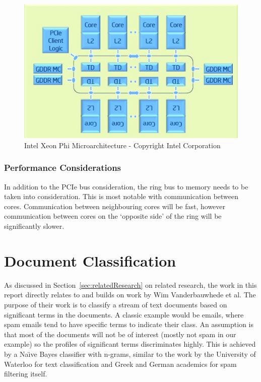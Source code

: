 \begin{figure}[H]
\centering
\includegraphics{images/intelXeonPhiMicroarchitecture.jpg}
\caption{Intel Xeon Phi Microarchitecture - Copyright Intel Corporation \textcopyright}
\label{fig:phiMicroarchitecture}
\end{figure}

\subsubsection{Performance Considerations}

In addition to the PCIe bus consideration, the ring bus to memory needs to be
taken into consideration. This is most notable with communication between cores.
Communication between neighbouring cores will be fast, however communication
between cores on the `opposite side' of the ring will be significantly slower.

\section{Document Classification}

As discussed in Section~\ref{sec:relatedResearch} on related research, the work
in this report directly relates to and builds on work by Wim Vanderbauwhede et
al. The purpose of their work is to classify a stream of text documents based on
significant terms in the documents. A classic example would be emails, where
spam emails tend to have specific terms to indicate their class. An assumption
is that most of the documents will not be of interest (mostly not spam in our
example) so the profiles of significant terms discriminates highly. This is
achieved by a Na{\"{\i}}ve Bayes classifier with n-grams, similar to the work by
the University of Waterloo \cite{peng2003combining} for text classification and
Greek \cite{metsis2006spam} and German \cite{Schneider:2003:CEM:1067807.1067848}
academics for spam filtering itself.

